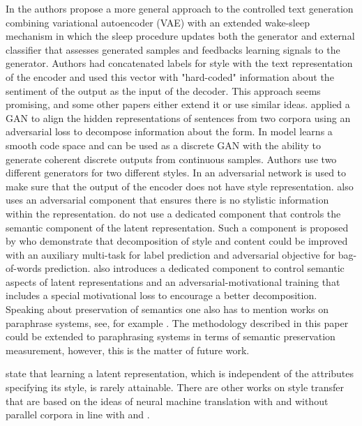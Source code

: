 \documentclass[11pt,a4paper]{article}
\begin{document}
In \cite{hylsx} the authors propose a more general approach to the controlled text generation combining variational autoencoder (VAE) with an extended wake-sleep mechanism in which the sleep procedure updates both the generator and external classifier that assesses generated samples and feedbacks learning signals to the generator. Authors had concatenated labels for style with the text representation of the encoder and used this vector with "hard-coded" information about the sentiment of the output as the input of the decoder. This approach seems promising, and some other papers either extend it or use similar ideas. \citet{Shen} applied a GAN to align the hidden representations of sentences from two corpora using an adversarial loss to decompose information about the form. In \cite{zhao} model learns a smooth code space and can be used as a discrete GAN with the ability to generate coherent discrete outputs from continuous samples. Authors use two different generators for two different styles. In \cite{fu2} an adversarial network is used to make sure that the output of the encoder does not have style representation. \cite{hylsx} also uses an adversarial component that ensures there is no stylistic information within the representation. \citet{fu2} do not use a dedicated component that controls the semantic component of the latent representation.  Such a component is proposed by \citet{john18} who demonstrate that decomposition of style and content could be improved with an auxiliary multi-task for label prediction and adversarial objective for bag-of-words prediction. \citet{romanov18} also introduces a dedicated component to control semantic aspects of latent representations and an adversarial-motivational training that includes a special motivational loss to encourage a better decomposition. Speaking about preservation of semantics one also has to mention works on paraphrase systems, see, for example \cite{para1, para2, para3}. The methodology described in this paper could be extended to paraphrasing systems in terms of semantic preservation measurement, however, this is the matter of future work.



\citet{subramanian18} state that learning a latent representation, which is independent of the attributes specifying its style, is rarely attainable. There are other works on style transfer that are based on the ideas of neural machine translation with \cite{Carlson} and without parallel corpora \cite{zhang18} in line with \cite{Lample} and \cite{Artetxe}.
\end{document}
